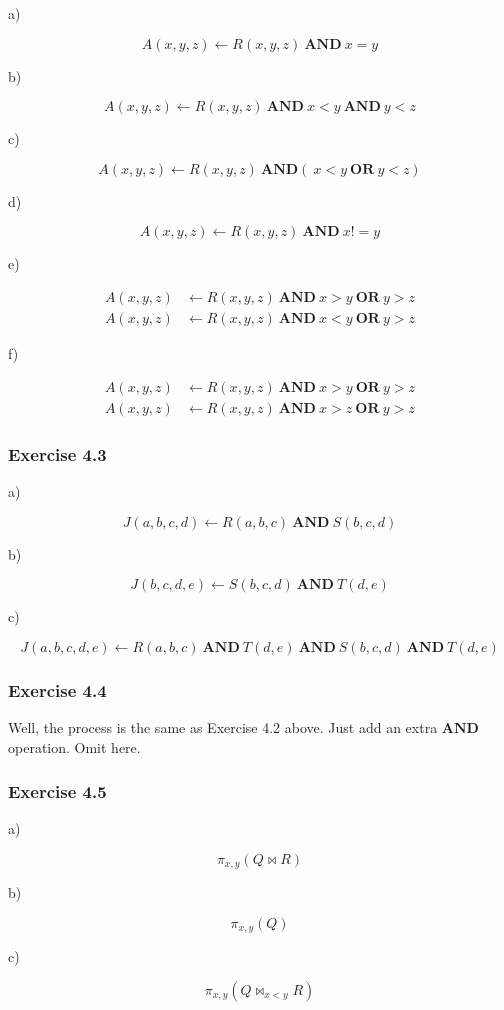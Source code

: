 \documentclass[../../main.tex]{subfiles}
\begin{document}
a)

$$
A(x, y, z) \leftarrow R(x, y, z) \ \mathbf{AND} \ x = y
$$

b)

$$
A(x, y, z) \leftarrow R(x, y, z) \ \mathbf{AND} \ x < y
  \ \mathbf{AND} \ y < z
$$

c)

$$
A(x, y, z) \leftarrow R(x, y, z) \ \mathbf{AND} (\ x < y
  \ \mathbf{OR} \ y < z)
$$

d)

$$
  A(x, y, z) \leftarrow R(x, y, z) \ \mathbf{AND} \ x != y
$$

e)

\begin{align*}
  A(x, y, z) &\leftarrow R(x, y, z) \ \mathbf{AND} \ x > y
    \ \mathbf{OR} \ y > z \\
  A(x, y, z) &\leftarrow R(x, y, z) \ \mathbf{AND} \ x < y
    \ \mathbf{OR} \ y > z
\end{align*}

f)

\begin{align*}
  A(x, y, z) &\leftarrow R(x, y, z) \ \mathbf{AND} \ x > y
    \ \mathbf{OR} \ y > z \\
  A(x, y, z) &\leftarrow R(x, y, z) \ \mathbf{AND} \ x > z
    \ \mathbf{OR} \ y > z
\end{align*}

\subsubsection*{Exercise 4.3}

a)

$$
J(a, b, c, d) \leftarrow R(a, b, c) \ \mathbf{AND} \ S(b, c, d)
$$

b)

$$
J(b, c, d, e) \leftarrow S(b, c, d) \ \mathbf{AND} \ T(d, e)
$$

c)

$$
J(a, b, c, d, e) \leftarrow R(a, b, c) \ \mathbf{AND} \ T(d, e)
\ \mathbf{AND} \ S(b, c, d) \ \mathbf{AND} \ T(d, e)
$$

\subsubsection*{Exercise 4.4}

Well, the process is the same as Exercise 4.2 above. Just add an extra
$\mathbf{AND}$ operation. Omit here.

\subsubsection*{Exercise 4.5}

a)

$$
\pi_{x, y}(Q \bowtie R)
$$

b)

$$
\pi_{x, y}(Q)
$$

c)

$$
\pi_{x, y}(Q \bowtie_{x < y} R)
$$
\end{document}
